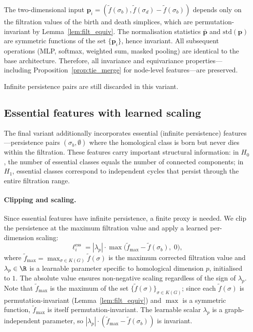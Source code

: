 \begin{remark}
The two-dimensional input $\mathbf{p}_i = (\tilde{f}(\sigma_b), \tilde{f}(\sigma_d) - \tilde{f}(\sigma_b))$ depends only on the filtration values of the birth and death simplices, which are permutation-invariant by Lemma~\ref{lem:filt_equiv}. The normalisation statistics $\bar{\mathbf{p}}$ and $\mathrm{std}(\mathbf{p})$ are symmetric functions of the set $\{\mathbf{p}_i\}$, hence invariant. All subsequent operations (MLP, softmax, weighted sum, masked pooling) are identical to the base architecture. Therefore, all invariance and equivariance properties---including Proposition~\ref{prop:tie_merge} for node-level features---are preserved.
\end{remark}

Infinite persistence pairs are still discarded in this variant.


\subsection{Essential features with learned scaling}
\label{sec:v5}

The final variant additionally incorporates essential (infinite persistence) features---persistence pairs $(\sigma_b, \emptyset)$ where the homological class is born but never dies within the filtration. These features carry important structural information: in $H_0$, the number of essential classes equals the number of connected components; in $H_1$, essential classes correspond to independent cycles that persist through the entire filtration range.

\paragraph{Clipping and scaling.}
Since essential features have infinite persistence, a finite proxy is needed. We clip the persistence at the maximum filtration value and apply a learned per-dimension scaling:
\[
    \ell_i^{\mathrm{ess}} = |\lambda_p| \cdot \max\!\big(\tilde{f}_{\max} - \tilde{f}(\sigma_b),\; 0\big),
\]
where $\tilde{f}_{\max} = \max_{\sigma \in K(G)} \tilde{f}(\sigma)$ is the maximum corrected filtration value and $\lambda_p \in \R$ is a learnable parameter specific to homological dimension $p$, initialised to $1$. The absolute value ensures non-negative scaling regardless of the sign of $\lambda_p$. Note that $\tilde{f}_{\max}$ is the maximum of the set $\{\tilde{f}(\sigma)\}_{\sigma \in K(G)}$; since each $\tilde{f}(\sigma)$ is permutation-invariant (Lemma~\ref{lem:filt_equiv}) and $\max$ is a symmetric function, $\tilde{f}_{\max}$ is itself permutation-invariant. The learnable scalar $\lambda_p$ is a graph-independent parameter, so $|\lambda_p| \cdot (\tilde{f}_{\max} - \tilde{f}(\sigma_b))$ is invariant.

